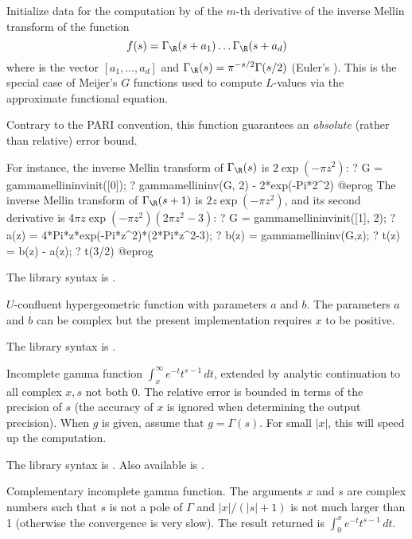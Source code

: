 \label{se:gammamellininvinit}
Initialize data for the computation by  of
the $m$-th derivative of the inverse Mellin transform of the function
$$f(s) = \Gamma_\R(s+a_1)\*\ldots\*\Gamma_\R(s+a_d)$$
where  is the vector $[a_1,\ldots,a_d]$ and
$\Gamma_\R(s)=\pi^{-s/2}\*\Gamma(s/2)$ (Euler's ). This is the
special case of Meijer's $G$ functions used to compute $L$-values via the
approximate functional equation.

 Contrary to the PARI convention, this function
guarantees an \emph{absolute} (rather than relative) error bound.

For instance, the inverse Mellin transform of $\Gamma_\R(s)$ is
$2\exp(-\pi z^2)$:
\bprog
? G = gammamellininvinit([0]);
? gammamellininv(G, 2) - 2*exp(-Pi*2^2)
@eprog
The inverse Mellin transform of $\Gamma_\R(s+1)$ is
$2 z\exp(-\pi z^2)$, and its second derivative is
$ 4\pi z \exp(-\pi z^2)(2\pi z^2 - 3)$:
\bprog
? G = gammamellininvinit([1], 2);
? a(z) = 4*Pi*z*exp(-Pi*z^2)*(2*Pi*z^2-3);
? b(z) = gammamellininv(G,z);
? t(z) = b(z) - a(z);
? t(3/2)
@eprog

The library syntax is .

\label{se:hyperu}
$U$-confluent hypergeometric function with
parameters $a$ and $b$. The parameters $a$ and $b$ can be complex but
the present implementation requires $x$ to be positive.

The library syntax is .

\label{se:incgam}
Incomplete gamma function $\int_x^\infty e^{-t}t^{s-1}\,dt$, extended by
analytic continuation to all complex $x, s$ not both $0$. The relative error
is bounded in terms of the precision of $s$ (the accuracy of $x$ is ignored
when determining the output precision). When $g$ is given, assume that
$g=\Gamma(s)$. For small $|x|$, this will speed up the computation.

The library syntax is .
Also available is .

\label{se:incgamc}
Complementary incomplete gamma function.
The arguments $x$ and $s$ are complex numbers such that $s$ is not a pole of
$\Gamma$ and $|x|/(|s|+1)$ is not much larger than 1 (otherwise the
convergence is very slow). The result returned is $\int_0^x
e^{-t}t^{s-1}\,dt$.

